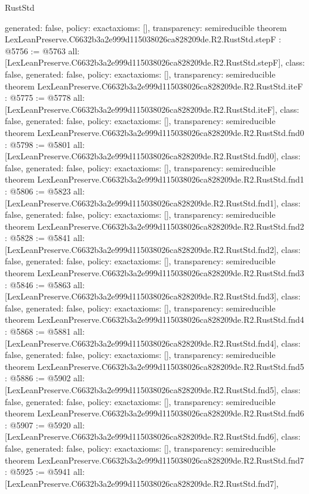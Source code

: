 \begin{lexlean}{RustStd}
\begin{coremodule}
{  generated: false,
  policy: exact{axioms: []},
  transparency: semireducible
}
theorem LexLeanPreserve.C6632b3a2e999d115038026ca828209de.R2.RustStd.stepF : @5756 := @5763 {
  all: [LexLeanPreserve.C6632b3a2e999d115038026ca828209de.R2.RustStd.stepF],
  class: false,
  generated: false,
  policy: exact{axioms: []},
  transparency: semireducible
}
theorem LexLeanPreserve.C6632b3a2e999d115038026ca828209de.R2.RustStd.iteF : @5775 := @5778 {
  all: [LexLeanPreserve.C6632b3a2e999d115038026ca828209de.R2.RustStd.iteF],
  class: false,
  generated: false,
  policy: exact{axioms: []},
  transparency: semireducible
}
theorem LexLeanPreserve.C6632b3a2e999d115038026ca828209de.R2.RustStd.fnd0 : @5798 := @5801 {
  all: [LexLeanPreserve.C6632b3a2e999d115038026ca828209de.R2.RustStd.fnd0],
  class: false,
  generated: false,
  policy: exact{axioms: []},
  transparency: semireducible
}
theorem LexLeanPreserve.C6632b3a2e999d115038026ca828209de.R2.RustStd.fnd1 : @5806 := @5823 {
  all: [LexLeanPreserve.C6632b3a2e999d115038026ca828209de.R2.RustStd.fnd1],
  class: false,
  generated: false,
  policy: exact{axioms: []},
  transparency: semireducible
}
theorem LexLeanPreserve.C6632b3a2e999d115038026ca828209de.R2.RustStd.fnd2 : @5828 := @5841 {
  all: [LexLeanPreserve.C6632b3a2e999d115038026ca828209de.R2.RustStd.fnd2],
  class: false,
  generated: false,
  policy: exact{axioms: []},
  transparency: semireducible
}
theorem LexLeanPreserve.C6632b3a2e999d115038026ca828209de.R2.RustStd.fnd3 : @5846 := @5863 {
  all: [LexLeanPreserve.C6632b3a2e999d115038026ca828209de.R2.RustStd.fnd3],
  class: false,
  generated: false,
  policy: exact{axioms: []},
  transparency: semireducible
}
theorem LexLeanPreserve.C6632b3a2e999d115038026ca828209de.R2.RustStd.fnd4 : @5868 := @5881 {
  all: [LexLeanPreserve.C6632b3a2e999d115038026ca828209de.R2.RustStd.fnd4],
  class: false,
  generated: false,
  policy: exact{axioms: []},
  transparency: semireducible
}
theorem LexLeanPreserve.C6632b3a2e999d115038026ca828209de.R2.RustStd.fnd5 : @5886 := @5902 {
  all: [LexLeanPreserve.C6632b3a2e999d115038026ca828209de.R2.RustStd.fnd5],
  class: false,
  generated: false,
  policy: exact{axioms: []},
  transparency: semireducible
}
theorem LexLeanPreserve.C6632b3a2e999d115038026ca828209de.R2.RustStd.fnd6 : @5907 := @5920 {
  all: [LexLeanPreserve.C6632b3a2e999d115038026ca828209de.R2.RustStd.fnd6],
  class: false,
  generated: false,
  policy: exact{axioms: []},
  transparency: semireducible
}
theorem LexLeanPreserve.C6632b3a2e999d115038026ca828209de.R2.RustStd.fnd7 : @5925 := @5941 {
  all: [LexLeanPreserve.C6632b3a2e999d115038026ca828209de.R2.RustStd.fnd7],
}
\end{coremodule}
\end{lexlean}
